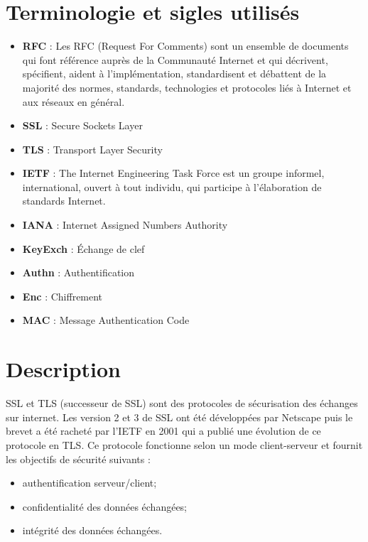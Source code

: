 \documentclass[a4paper,11pt,french]{article}
\begin{document}
\section{Terminologie et sigles utilisés}
\begin{itemize}
	\item \textbf{RFC} : Les RFC (Request For Comments) sont un ensemble de documents qui font référence auprès de la Communauté Internet et qui décrivent, spécifient, aident à l'implémentation, standardisent et débattent de la majorité des normes, standards, technologies et protocoles liés à Internet et aux réseaux en général. 
    \item \textbf{SSL} : Secure Sockets Layer
    \item \textbf{TLS} : Transport Layer Security 
    \item \textbf{IETF} : The Internet Engineering Task Force est un groupe informel, international, ouvert à tout individu, qui participe à l'élaboration de standards Internet.
    \item \textbf{IANA} : Internet Assigned Numbers Authority
    \item \textbf{KeyExch} : Échange de clef
    \item \textbf{Authn} : Authentification
    \item \textbf{Enc} : Chiffrement
    \item \textbf{MAC} :  Message Authentication Code
\end{itemize}

\section{Description}

SSL et TLS (successeur de SSL) sont des protocoles de sécurisation des échanges sur internet. Les version 2 et 3 de SSL ont été développées par Netscape puis le brevet a été racheté par l'IETF en 2001 qui a publié une évolution de ce protocole en TLS. Ce protocole fonctionne selon un mode client-serveur et fournit les objectifs de sécurité suivants :
\begin{itemize}
\item authentification serveur/client;
\item confidentialité des données échangées;
\item intégrité des données échangées.
\end{itemize}
\end{document}
